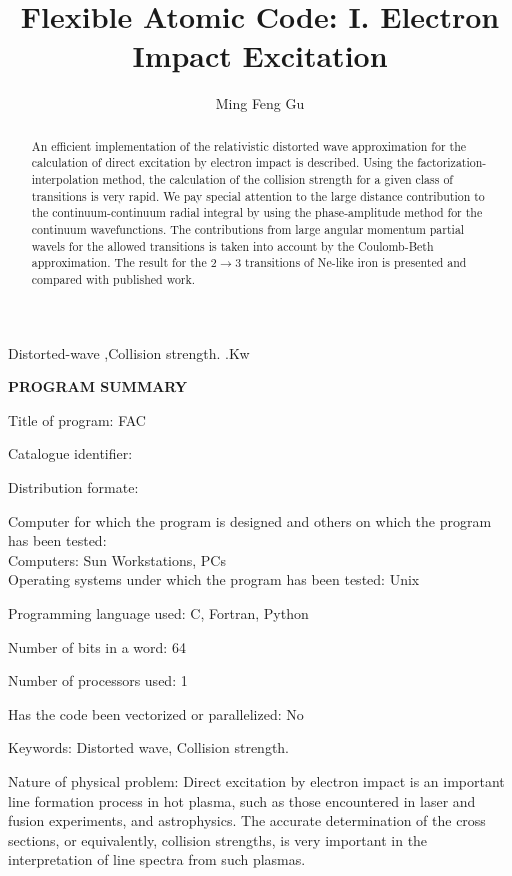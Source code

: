 \documentclass{elsart}
\begin{document}
\begin{frontmatter}

\title{Flexible Atomic Code: I. Electron Impact Excitation} 
\author{Ming Feng Gu}
\address{Massachusetts Institute of Technology, Cambridge, MA 02139, USA}

\begin{abstract}
An efficient implementation of the relativistic distorted wave approximation
for the calculation of direct excitation by electron impact is
described. Using the factorization-interpolation method, the calculation of
the collision strength 
for a given class of transitions is very rapid. We pay special attention to
the large distance contribution to the continuum-continuum radial
integral by using the phase-amplitude method for the continuum
wavefunctions. The 
contributions from large angular momentum partial wavels for the allowed
transitions is taken into account by the Coulomb-Beth approximation. The
result for the $2\to 3$ transitions of Ne-like iron is presented and compared
with published work.  
\end{abstract}

\begin{keyword}
Distorted-wave \sep Collision strength.
.Kw
\end{keyword}
\end{frontmatter}

\textbf{\large PROGRAM SUMMARY}

Title of program: FAC

Catalogue identifier:

Distribution formate:

Computer for which the program is designed and others on which the program has
been tested:\\
Computers: Sun Workstations, PCs\\
Operating systems under which the program has been tested: Unix

Programming language used: C, Fortran, Python

Number of bits in a word: 64

Number of processors used: 1

Has the code been vectorized or parallelized: No

Keywords: Distorted wave, Collision strength.

Nature of physical problem: Direct excitation by electron impact is an
important line formation process in hot plasma, such as those encountered in
laser and fusion experiments, and astrophysics. The accurate determination of
the cross sections, or equivalently, collision strengths, is very important
in the interpretation of line spectra from such plasmas.
\end{document}
